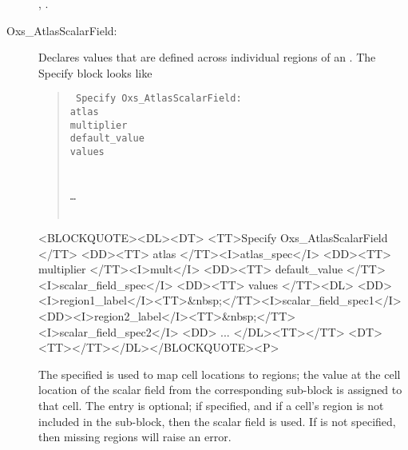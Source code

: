 \begin{description}
\begin{ExampleMifs}
  , .
\end{ExampleMifs}


\item[Oxs\_AtlasScalarField:\label{item:AtlasScalarField}]
%
   Declares values that are defined across individual regions of an
   .  The Specify block looks like
      \begin{latexonly}
      \begin{quote}\tt
      Specify Oxs\_AtlasScalarField: \ocb\\
       \bi atlas \\
       \bi multiplier \\
       \bi default\_value \\
       \bi values \ocb\\
         \bi\bi{}\\
         \bi\bi{}\\
         \bi\bi \ldots\\
       \bi\ccb\\
      \ccb
      \end{quote}
      \end{latexonly}
      \begin{rawhtml}
      <BLOCKQUOTE><DL><DT>
      <TT>Specify Oxs_AtlasScalarField {</TT>
      <DD><TT> atlas </TT><I>atlas_spec</I>
      <DD><TT> multiplier </TT><I>mult</I>
      <DD><TT> default_value </TT><I>scalar_field_spec</I>
      <DD><TT> values {</TT><DL>
          <DD><I>region1_label</I><TT>&nbsp;</TT><I>scalar_field_spec1</I>
          <DD><I>region2_label</I><TT>&nbsp;</TT><I>scalar_field_spec2</I>
          <DD> ...
      </DL><TT>}</TT>
      <DT><TT>}</TT></DL></BLOCKQUOTE><P>
      \end{rawhtml}

   The specified  is used to map cell locations to
   regions; the value at the cell location of the scalar field from the
   corresponding  sub-block is assigned to that cell.
   The  entry is optional; if specified, and if
   a cell's region is not included in the  sub-block, then
   the  scalar field is used.  If 
   is not specified, then missing regions will raise an error.


\end{description}
